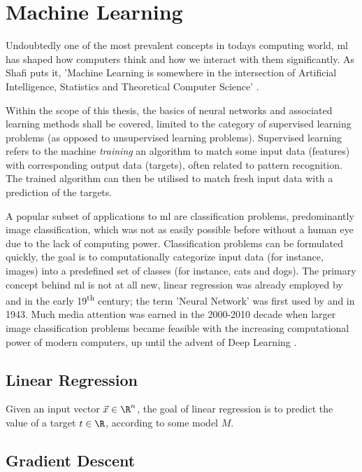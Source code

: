 \pagebreak
\section{Machine Learning}
Undoubtedly one of the most prevalent concepts in todays computing world, \gls{ml} has shaped
how computers think and how we interact with them significantly.
As Shafi  puts it, 'Machine Learning is somewhere in the intersection of Artificial Intelligence,
Statistics and Theoretical Computer Science' \parencite{goldwasserTalk2018}.

Within the scope of this thesis, the basics of neural networks and associated learning methods shall be covered,
limited to the category of supervised learning problems (as opposed to unsupervised learning problems).
Supervised learning refers to the machine \textit{training} an algorithm to match some input data (features)
with corresponding output data (targets), often related to pattern recognition.
The trained algorithm can then be utilised to match fresh input data with a prediction of the targets.

A popular subset of applications to \gls{ml} are classification problems, predominantly image classification,
which was not as easily possible before without a human eye due to the lack of computing power.
Classification problems can be formulated quickly, the goal is to computationally categorize input data
(for instance, images) into a predefined set of classes (for instance, cats and dogs).
The primary concept behind \acrlong{ml} is not at all new, linear regression
was already employed by  and  in the early 19\textsuperscript{th} century;
the term 'Neural Network' was first used by  and  in 1943.
Much media attention was earned in the 2000-2010 decade when larger image classification problems
became feasible with the increasing computational power of modern computers,
up until the advent of Deep Learning \parencite{bishop-pattern-recognition-and-ml}.

\subsection{Linear Regression}
Given an input vector $\vec{x} \in \R^n$, the goal of linear regression is to predict the value of a target $t \in \R$,
according to some model $M$.

\subsection{Gradient Descent}
